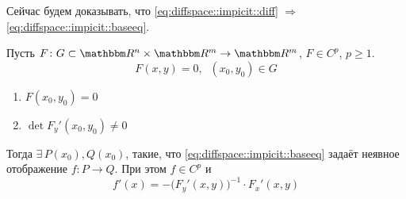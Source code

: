 \documentclass[12pt,timbord]{../../../notes}
\begin{document}
Сейчас будем доказывать, что \eqref{eq:diffspace::impicit::diff} $\Rightarrow$ \eqref{eq:diffspace::impicit::baseeq}.


\begin{thrm}\label{thrm:diffspace::implicit}
  Пусть $F\colon G \subset \R^n \times \R^m \to \R^m $, $F \in C^p$, $p \geqslant 1$.
  \[
    F(x, y) = 0, \;\; (x_0, y_0) \in G
  \]
  \begin{enumerate}
    \item $F(x_0, y_0) = 0 $
    \item $\det F_y'(x_0, y_0) \neq 0$
  \end{enumerate}

  Тогда $\exists\, P(x_0), Q(x_0)$, такие, что \eqref{eq:diffspace::impicit::baseeq} задаёт
  неявное отображение $f\colon P \to Q$. При этом $f\in C^p$ и 
  \[
    f'(x) = - \bigl(F_y'(x,y)\bigr)^{-1} \cdot F_x'(x,y)
  \]
\end{thrm}
\end{document}
